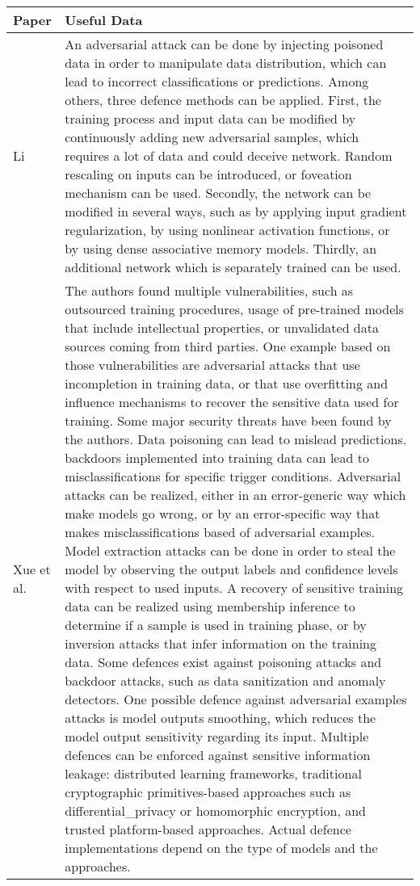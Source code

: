\begin{small}
\begin{landscape}

	\newpage

	\begin{longtable}{p{1.5cm}|p{20.7cm}}
		\toprule[0.8mm]
		\textbf{Paper} & \textbf{Useful Data} \\
		\midrule[0.8mm]
		\endhead
		Li \cite{li_cyber_2018} & An adversarial attack can be done by injecting poisoned data in order to manipulate data distribution, which can lead to incorrect classifications or predictions. Among others, three defence methods can be applied. First, the training process and input data can be modified by continuously adding new adversarial samples, which requires a lot of data and could deceive network. Random rescaling on inputs can be introduced, or foveation mechanism can be used. Secondly, the network can be modified in several ways, such as by applying input \gls{gradient} \gls{regularization}, by using nonlinear activation functions, or by using dense associative memory models. Thirdly, an additional network which is separately trained can be used. \\ %
		\midrule
		Xue et al. \cite{xue_machine_2020} & The authors found multiple vulnerabilities, such as outsourced training procedures, usage of pre-trained models that include intellectual properties, or unvalidated data sources coming from third parties. One example based on those vulnerabilities are adversarial attacks that use incompletion in training data, or that use overfitting and influence mechanisms to recover the sensitive data used for training. Some major security threats have been found by the authors. Data poisoning can lead to mislead predictions. \glspl{backdoor} implemented into training data can lead to misclassifications for specific trigger conditions. Adversarial attacks can be realized, either in an error-generic way which make models go wrong, or by an error-specific way that makes misclassifications based of adversarial examples. Model extraction attacks can be done in order to steal the model by observing the output labels and confidence levels with respect to used inputs. A recovery of sensitive training data can be realized using membership inference to determine if a sample is used in training phase, or by inversion attacks that infer information on the training data. Some defences exist against poisoning attacks and \gls{backdoor} attacks, such as data sanitization and anomaly detectors. One possible defence against adversarial examples attacks is model outputs smoothing, which reduces the model output sensitivity regarding its input. Multiple defences can be enforced against sensitive information leakage: distributed learning \glspl{framework}, traditional cryptographic primitives-based approaches such as \gls{differential_privacy} or homomorphic encryption, and trusted platform-based approaches. Actual defence implementations depend on the type of models and the approaches. \\ %

\end{longtable}
\end{landscape}
\end{small}

